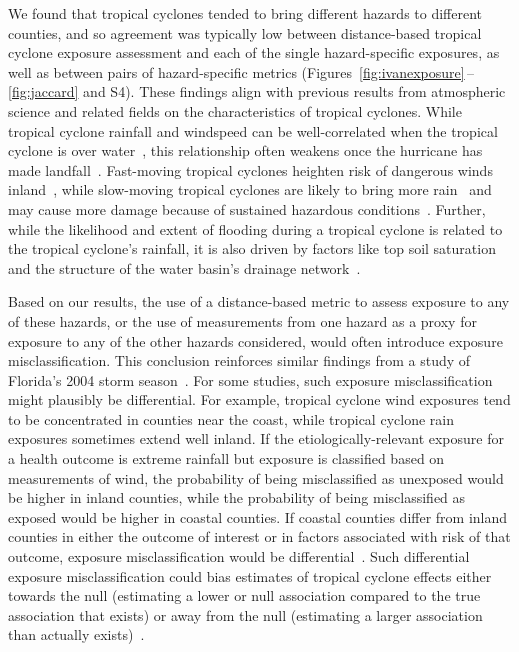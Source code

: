 We found that tropical cyclones tended to bring different hazards to different
counties, and so agreement was typically low between distance-based
tropical cyclone exposure assessment and each of the single hazard-specific
exposures, as well as between pairs of hazard-specific metrics
(Figures~\ref{fig:ivanexposure}\,--\,\ref{fig:jaccard} and S4).  These
findings align with previous results from atmospheric science and related
fields on the characteristics of tropical cyclones. While tropical cyclone
rainfall and windspeed can be well-correlated when the tropical cyclone is over
water~\parencite{cerveny2000}, this relationship often weakens once the
hurricane has made landfall~\parencite{jiang2008}.  Fast-moving tropical
cyclones heighten risk of dangerous winds inland~\parencite{kruk2010},
while slow-moving tropical cyclones are likely to bring more
rain~\parencite{rappaport2000} and may cause more damage because of sustained
hazardous conditions~\parencite{rezapour2014}. Further, while the likelihood
and extent of flooding during a tropical cyclone is related to the tropical
cyclone's rainfall, it is also driven by factors like top soil saturation and
the structure of the water basin's drainage network~\parencite{chen2015,
rees2001}. 

Based on our results, the use of a distance-based metric to assess exposure to any of
these hazards, or the use of measurements from one hazard as a proxy for
exposure to any of the other hazards considered, would often introduce exposure
misclassification. This conclusion reinforces similar findings from a study of
Florida's 2004 storm season~\parencite{grabich2015measuring}.  For some
studies, such exposure misclassification might plausibly be differential.  For
example, tropical cyclone wind exposures tend to be concentrated in counties
near the coast, while tropical cyclone rain exposures sometimes extend well
inland.  If the etiologically-relevant exposure for a health outcome is extreme
rainfall but exposure is classified based on measurements of wind, the
probability of being misclassified as unexposed would be higher in inland
counties, while the probability of being misclassified as exposed would be
higher in coastal counties. If coastal counties differ from inland counties in
either the outcome of interest or in factors associated with risk of that
outcome, exposure misclassification would be
differential~\parencite{savitz2016interpreting}.  Such differential exposure
misclassification could bias estimates of tropical cyclone effects either
towards the null (estimating a lower or null association compared to the true
association that exists) or away from the null (estimating a larger association
than actually exists)~\parencite{savitz2016interpreting, armstrong1998effect}.  

